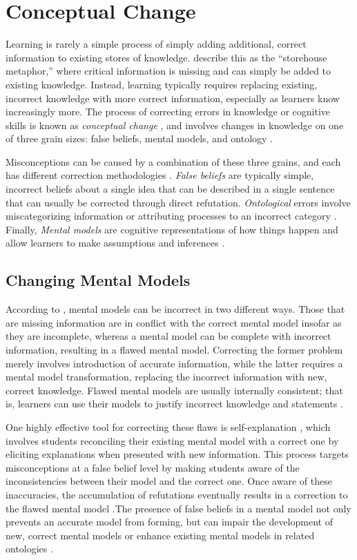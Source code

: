 \section{Conceptual Change}

Learning is rarely a simple process of simply adding additional, correct information to existing stores of knowledge. \citet{Klein2006} describe this as the ``storehouse metaphor,'' where critical information is missing and can simply be added to existing knowledge. Instead, learning typically requires replacing existing, incorrect knowledge with more correct information, especially as learners know increasingly more. The process of correcting errors in knowledge or cognitive skills is known as \emph{conceptual change} \citep{Chi2008}, and involves changes in knowledge on one of three grain sizes: false beliefs, mental models, and ontology \citep{Gadgil2012}.

Misconceptions can be caused by a combination of these three grains, and each has different correction methodologies \citep{Gadgil2012}. \emph{False beliefs} are typically simple, incorrect beliefs about a single idea that can be described in a single sentence that can usually be corrected through direct refutation. \emph{Ontological} errors involve miscategorizing information or attributing processes to an incorrect category \citep{Chi1994}. Finally, \emph{Mental models} are cognitive representations of how things happen \citep{Klein2006} and allow learners to make assumptions and inferences \citep{Gadgil2012}.

\subsection{Changing Mental Models}

According to \citet{Chi2008}, mental models can be incorrect in two different ways. Those that are missing information are in conflict with the correct mental model insofar as they are incomplete, whereas a mental model can be complete with incorrect information, resulting in a flawed mental model. Correcting the former problem merely involves introduction of accurate information, while the latter requires a mental model transformation, replacing the incorrect information with new, correct knowledge. Flawed mental models are usually internally consistent; that is, learners can use their models to justify incorrect knowledge and statements \citep{Vosniadou1994}.

One highly effective tool for correcting these flaws is self-explanation \citep{Chi1994}, which involves students reconciling their existing mental model with a correct one by eliciting explanations when presented with new information. This process targets misconceptions at a false belief level by making students aware of the inconsistencies between their model and the correct one. Once aware of these inaccuracies, the accumulation of refutations eventually results in a correction to the flawed mental model \citep{Chi2008}.The presence of false beliefs in a mental model not only prevents an accurate model from forming, but can impair the development of new, correct mental models or enhance existing mental models in related ontologies \citep{Jacobson2013}.

